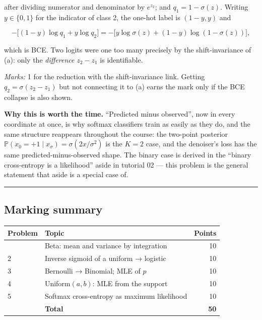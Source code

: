 \documentclass[
  11pt,
  a4paper,
]{article}
\newcounter{none} %
\newcommand{\PP}{\mathbb{P}}
\newcommand{\sig}{\sigma}
\begin{document}
after dividing numerator and denominator by \(e^{z_2}\); and
\(q_1 = 1 - \sig(z)\). Writing \(y \in \{0,1\}\) for the indicator of
class 2, the one-hot label is \((1-y, y)\) and

\[
-\big[(1-y)\log q_1 + y\log q_2\big]
= -\big[y\log\sig(z) + (1-y)\log(1-\sig(z))\big],
\]

which is BCE. Two logits were one too many precisely by the
shift-invariance of (a): only the \emph{difference} \(z_2 - z_1\) is
identifiable.

\emph{Marks:} 1 for the reduction with the shift-invariance link.
Getting \(q_2 = \sig(z_2-z_1)\) but not connecting it to (a) earns the
mark only if the BCE collapse is also shown.

\textbf{Why this is worth the time.} ``Predicted minus observed'', now
in every coordinate at once, is why softmax classifiers train as easily
as they do, and the same structure reappears throughout the course: the
two-point posterior \(\PP(x_0 = +1 \mid x_\sigma) = \sig(2x/\sigma^2)\)
is the \(K=2\) case, and the denoiser's loss has the same
predicted-minus-observed shape. The binary case is derived in the
``binary cross-entropy is a likelihood'' aside in tutorial 02 --- this
problem is the general statement that aside is a special case of.

\begin{center}\rule{0.5\linewidth}{0.5pt}\end{center}

\subsection{Marking summary}\label{marking-summary}

{\def\LTcaptype{none} %
\begin{longtable}[]{@{}llr@{}}
\toprule\noalign{}
Problem & Topic & Points \\
\midrule\noalign{}
\endhead
\bottomrule\noalign{}
\endlastfoot
1 & Beta: mean and variance by integration & 10 \\
2 & Inverse sigmoid of a uniform → logistic & 10 \\
3 & Bernoulli → Binomial; MLE of \(p\) & 10 \\
4 & Uniform\((a,b)\): MLE from the support & 10 \\
5 & Softmax cross-entropy as maximum likelihood & 10 \\
& \textbf{Total} & \textbf{50} \\
\end{longtable}
}
\end{document}
